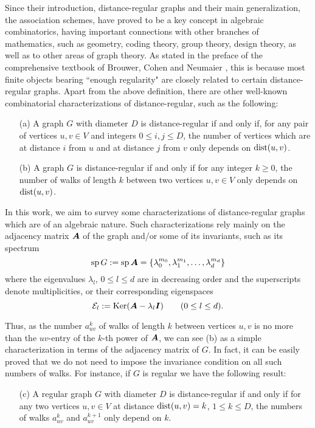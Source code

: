 \documentclass[11pt]{article}
\def\A{\mbox{\boldmath $A$}}
\def\I{\mbox{\boldmath $I$}}
\def\dist{\mathop{\rm dist}\nolimits}
\def\Ker{\mathop{\rm Ker}\nolimits}
\def\sp{\mathop{\rm sp}\nolimits}
\begin{document}
Since their introduction, distance-regular graphs and
their main  generalization, the association schemes, 
have proved to be a key concept in algebraic combinatorics, having
important connections with other branches of mathematics, such as
geometry, coding theory, group theory, design theory, as well as
to other areas of graph theory. As stated in the preface of the
comprehensive textbook of Brouwer, Cohen and Neumaier
\cite{bcn89}, this is because most finite objects bearing ``enough
regularity"  are closely related to certain
distance-regular graphs.
Apart from the above definition, there are other well-known
combinatorial characterizations of distance-regular, such as the
following:
\begin{itemize}
\item[(a)]
A graph $G$ with diameter $D$ is distance-regular if and only if, for 
any pair of vertices $u,v\in V$ and integers $0\le i,j\le D$, the
number of vertices which are at distance $i$ from $u$ and at
distance $j$ from
$v$ only depends on 
$\dist(u,v)$. 
\item[(b)]
A graph $G$ is distance-regular if and only if for any integer $k\ge 0$, the
number of walks of length $k$ between two vertices $u,v\in V$ only
depends on $\dist(u,v)$. 
\end{itemize}

In this work, we aim to survey some characterizations  of
distance-regular graphs which are of an algebraic nature. Such
characterizations rely mainly on the adjacency matrix $\A$ of the
graph and/or some of its invariants, such as its spectrum
$$
\sp G:=\sp \A=\{\lambda_0^{m_0},\lambda_1^{m_1},\ldots,
\lambda_d^{m_d}\}
$$
where the eigenvalues $\lambda_l$, $0\le l\le d$ are in decreasing
order and the superscripts denote multiplicities, or their
corresponding eigenspaces
$$
{\cal E}_l:=\Ker(\A-\lambda_l\I)\qquad (0\le l\le d).
$$

Thus, as the number $a_{uv}^k$ of walks of length $k$ between
vertices $u,v$ is no more than the $uv$-entry of the $k$-th
power of $\A$, we can see (b) as a simple characterization in terms
of the adjacency matrix of $G$. In fact,   it can be
easily proved that we do not  need to impose the invariance
condition on all such numbers of walks. For instance, if $G$ is
regular we have the following result:
\begin{itemize}
\item[(c)]
A  regular graph $G$ with diameter $D$ is distance-regular if and
only if for any two vertices $u,v\in V$ at distance $\dist(u,v)=k$,
$1\le k\le D$, the numbers of walks $a_{uv}^k$ and $a_{uv}^{k+1}$
only depend on
$k$.
\end{itemize}
\end{document}
